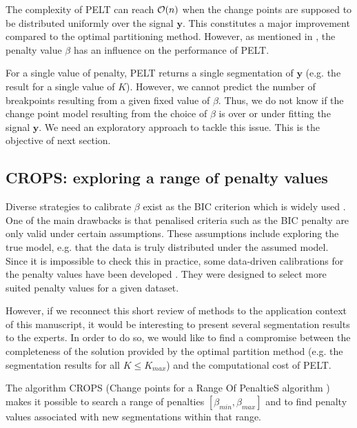 The complexity of PELT can reach ${\mathcal O}(n)$ when the change points are supposed to be distributed uniformly over the signal $\bm y$. This constitutes a major improvement compared to the optimal partitioning method. However, as mentioned in \cite{Haynes2016}, the penalty value $\beta$ has an influence on the performance of PELT. 

For a single value of penalty, PELT returns a single segmentation of $\bm y$ (e.g. the result for a single value of $K$). However, we cannot predict the number of breakpoints resulting from a given fixed value of $\beta$. Thus, we do not know if the change point model resulting from the choice of $\beta$ is over or under fitting the signal $\bm y$. We need an exploratory approach to tackle this issue. This is the objective of next section.
   

\subsection{CROPS: exploring a range of penalty values}\label{chp:3:4:2}

Diverse strategies to calibrate $\beta$ exist as the BIC criterion which is widely used \citep{YAO1988181,faure2016comparison,Shi2022}. 
One of the main drawbacks is that penalised criteria such as the BIC penalty are only valid under certain assumptions. These assumptions include exploring the true model, e.g. that the data is truly distributed under the assumed model. Since it is impossible to check this in practice, some data-driven calibrations for the penalty values have been developed \citep{Birge2006,Baudry2011,Bardet2012,arlot2009data}. They were designed to select more suited penalty values for a given dataset.  

However, if we reconnect this short review of methods to the application context of this manuscript, it would be interesting to present several segmentation results to the experts. In order to do so, we would like to find a compromise between the completeness of the solution provided by the optimal partition method (e.g. the segmentation results for all $K \leq K_{max}$) and the computational cost of PELT. 

The algorithm CROPS (Change points for a Range Of PenaltieS algorithm \cite{haynes2017}) makes it possible to search a range of penalties $[\beta_{min},\beta_{max}]$ and to find penalty values associated with new segmentations within that range. 

